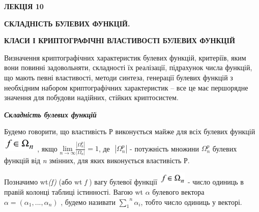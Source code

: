 \documentclass[a4paper]{article}
\newcounter{}
\begin{document}
\bigskip


\bigskip


\bigskip


\bigskip


\bigskip


\bigskip


\bigskip


\bigskip

{\bfseries
ЛЕКЦІЯ  10}


\bigskip

{\centering\bfseries
СКЛАДНІСТЬ БУЛЕВИХ ФУНКЦІЙ.
\par}

{\centering\bfseries
КЛАСИ  І  КРИПТОГРАФІЧНІ ВЛАСТИВОСТІ БУЛЕВИХ ФУНКЦІЙ
\par}


\bigskip


\bigskip

Визначення криптографічних характеристик булевих функцій, критеріїв, яким вони
повинні задовольняти, складності їх реалізації,  підрахунок  числа функцій, що
мають певні властивості, методи синтеза, генерації булевих функцій з необхідним
набором криптографічних характеристик – все це має першорядне значення для
побудови надійних, стійких криптосистем.


\bigskip


\bigskip

{\centering\bfseries\itshape
Складність булевих функцій
\par}


\bigskip


\bigskip

Будемо говорити, що властивість Р виконується майже для всіх булевих функцій 
\includegraphics[width=0.6311in,height=0.2972in]{crypt-img/crypt-img169.png} ,
якщо  ${\underset{{n\rightarrow \infty }}{{\text{lim}}}\frac{|\Omega
_{{n}}^{{p}}|}{|\Omega _{{n}}|}=1}$, де  $ $ ${|\Omega _{{n}}^{{p}}|}$ -
потужність множини  ${\Omega _{{n}}^{{p}}}$ булевих функцій від \textit{n}
змінних, для яких виконується властивість Р.

Позначимо wt\textit{(}\textit{f}\textit{)} (або  wt \textit{f}\textit{ 
})\textit{  }вагу булевої  функції 
\includegraphics[width=0.528in,height=0.25in]{crypt-img/crypt-img170.png}  -
число одиниць в правій колонці таблиці істинності. Вагою wt ${\alpha }$
булевого вектора  ${\alpha =(\alpha _{{1}},\text{.}\text{.}\text{.},\alpha
_{{n}})}$ , будемо називати  ${\overset{{n}}{\underset{{1}}{\sum }}{\alpha
_{{i}}}}$, тобто число одиниць у векторі.
\end{document}
